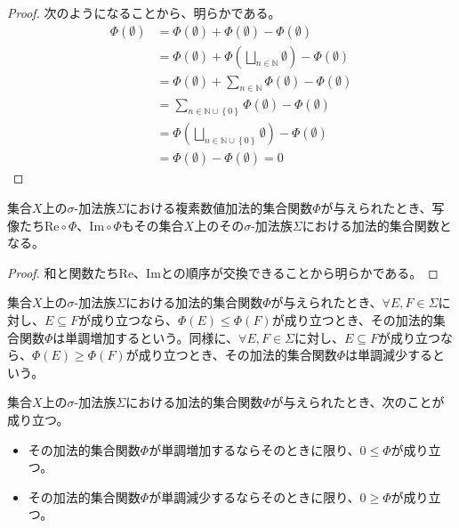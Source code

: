 \documentclass[dvipdfmx]{jsarticle}
\begin{document}
\begin{proof} 次のようになることから、明らかである。
\begin{align*}
\varPhi(\emptyset) &= \varPhi(\emptyset) + \varPhi(\emptyset) - \varPhi(\emptyset)\\
&= \varPhi(\emptyset) + \varPhi\left( \bigsqcup_{n \in \mathbb{N}} \emptyset \right) - \varPhi(\emptyset)\\
&= \varPhi(\emptyset) + \sum_{n \in \mathbb{N}} {\varPhi(\emptyset)} - \varPhi(\emptyset)\\
&= \sum_{n \in \mathbb{N} \cup \left\{ 0 \right\}} {\varPhi(\emptyset)} - \varPhi(\emptyset)\\
&= \varPhi\left( \bigsqcup_{n \in \mathbb{N} \cup \left\{ 0 \right\}} \emptyset \right) - \varPhi(\emptyset)\\
&= \varPhi(\emptyset) - \varPhi(\emptyset) = 0
\end{align*}
\end{proof}
\begin{thm}\label{4.6.7.2}
集合$X$上の$\sigma$-加法族$\varSigma$における複素数値加法的集合関数$\varPhi$が与えられたとき、写像たち$\mathrm{Re} \circ \varPhi$、$\mathrm{Im} \circ \varPhi$もその集合$X$上のその$\sigma$-加法族$\varSigma$における加法的集合関数となる。
\end{thm}
\begin{proof}
和と関数たち$\mathrm{Re}$、$\mathrm{Im}$との順序が交換できることから明らかである。
\end{proof}
\begin{dfn}
集合$X$上の$\sigma$-加法族$\varSigma$における加法的集合関数$\varPhi$が与えられたとき、$\forall E,F \in \varSigma$に対し、$E \subseteq F$が成り立つなら、$\varPhi(E) \leq \varPhi(F)$が成り立つとき、その加法的集合関数$\varPhi$は単調増加するという。同様に、$\forall E,F \in \varSigma$に対し、$E \subseteq F$が成り立つなら、$\varPhi(E) \geq \varPhi(F)$が成り立つとき、その加法的集合関数$\varPhi$は単調減少するという。
\end{dfn}
\begin{thm}\label{4.6.7.3}
集合$X$上の$\sigma$-加法族$\varSigma$における加法的集合関数$\varPhi$が与えられたとき、次のことが成り立つ。
\begin{itemize}
\item
  その加法的集合関数$\varPhi$が単調増加するならそのときに限り、$0 \leq \varPhi$が成り立つ。
\item
  その加法的集合関数$\varPhi$が単調減少するならそのときに限り、$0 \geq \varPhi$が成り立つ。
\end{itemize}
\end{thm}
\end{document}
